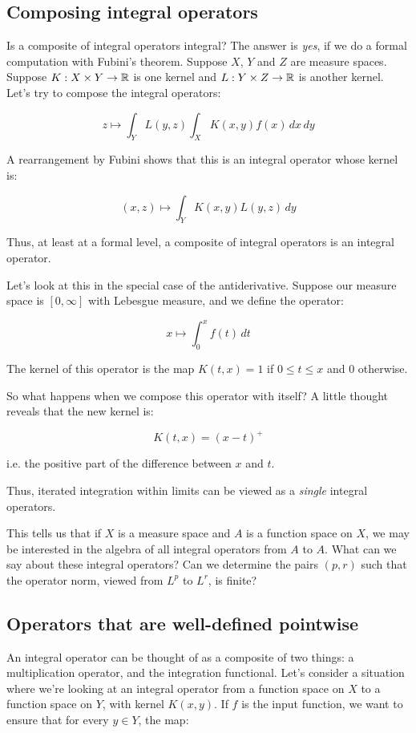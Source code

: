 \documentclass[a4paper]{amsart}
\begin{document}
\subsection{Composing integral operators}

Is a composite of integral operators integral? The answer is {\em
  yes}, if we do a formal computation with Fubini's theorem. Suppose
$X$, $Y$ and $Z$ are measure spaces. Suppose $K:X \times Y \to \mathbb{R}$ is
one kernel and $L:Y \times Z \to \mathbb{R}$ is another kernel. Let's try to
compose the integral operators:

$$z \mapsto \int_Y L(y,z) \int_X K(x,y) f(x) \, dx \, dy$$

A rearrangement by Fubini shows that this is an integral operator
whose kernel is:

$$(x,z) \mapsto \int_Y K(x,y) L(y,z) \, dy$$

Thus, at least at a formal level, a composite of integral operators is
an integral operator.

Let's look at this in the special case of the antiderivative.
Suppose our measure space is $[0,\infty]$ with Lebesgue measure, and we define the operator:

$$x \mapsto \int_0^x f(t) \, dt$$

The kernel of this operator is the map $K(t,x) = 1$ if $0 \le t \le x$ and $0$ otherwise.

So what happens when we compose this operator with itself? A little thought reveals that the new kernel is:

$$K(t,x) = (x-t)^+$$

i.e. the positive part of the difference between $x$ and $t$.

Thus, iterated integration within limits can be viewed as a {\em
  single} integral operators.


This tells us that if $X$ is a measure space and $A$ is a function
space on $X$, we may be interested in the algebra of all integral
operators from $A$ to $A$. What can we say about these integral
operators? Can we determine the pairs $(p,r)$ such that the operator
norm, viewed from $L^p$ to $L^r$, is finite?

\subsection{Operators that are well-defined pointwise}

An integral operator can be thought of as a composite of two things: a
multiplication operator, and the integration functional. Let's
consider a situation where we're looking at an integral operator from
a function space on $X$ to a function space on $Y$, with kernel
$K(x,y)$. If $f$ is the input function, we want to ensure that for
every $y \in Y$, the map:
\end{document}
